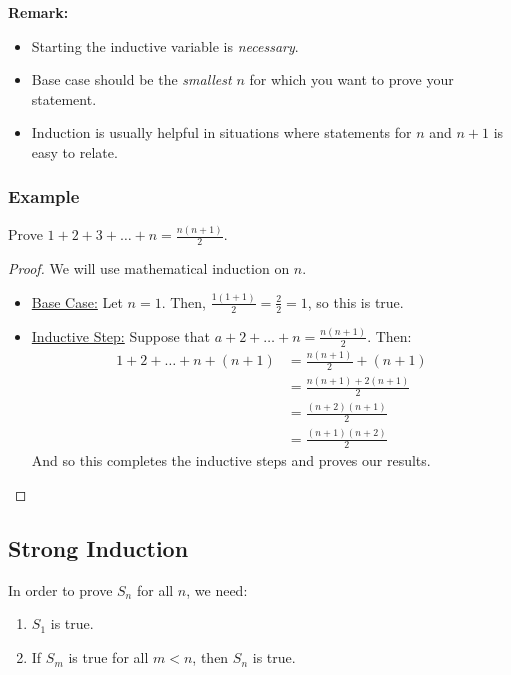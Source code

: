 \documentclass[letterpaper]{article}
\begin{document}
\textbf{Remark:}
\begin{itemize}
    \item Starting the inductive variable is \emph{necessary}.
    \item Base case should be the \emph{smallest} $n$ for which you want to prove your statement.
    \item Induction is usually helpful in situations where statements for $n$ and $n + 1$ is easy to relate. 
\end{itemize}

\subsubsection{Example}
Prove $1 + 2 + 3 + \dots + n = \frac{n(n + 1)}{2}$. 

\begin{proof}
    We will use mathematical induction on $n$. 
    \begin{itemize}
        \item[\mdiamond] \underline{Base Case:} Let $n = 1$. Then, $\frac{1(1 + 1)}{2} = \frac{2}{2} = 1$, so this is true.
        \item[\mdiamond] \underline{Inductive Step:} Suppose that $a + 2 + \dots + n = \frac{n(n + 1)}{2}$. Then:
        \begin{equation*}
            \begin{aligned}
                1 + 2 + \dots + n + (n + 1) &= \frac{n(n + 1)}{2} + (n + 1) \\ 
                    &= \frac{n(n + 1) + 2(n + 1)}{2} \\ 
                    &= \frac{(n + 2)(n + 1)}{2} \\ 
                    &= \frac{(n + 1)(n + 2)}{2}
            \end{aligned}
        \end{equation*}  
        And so this completes the inductive steps and proves our results. \qedhere
    \end{itemize}
\end{proof}

\subsection{Strong Induction}
In order to prove $S_n$ for all $n$, we need:
\begin{enumerate}
    \item $S_1$ is true.
    \item If $S_m$ is true for all $m < n$, then $S_n$ is true.
\end{enumerate}
\end{document}
